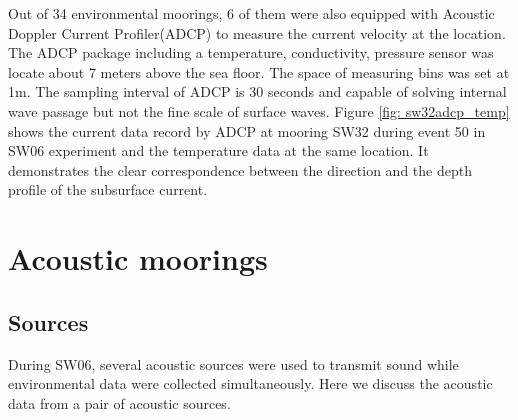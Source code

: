 Out of 34 environmental moorings, 6 of them were also equipped with Acoustic Doppler Current Profiler(ADCP) to measure the current velocity at the location. The ADCP package including a temperature, conductivity, pressure sensor was locate about 7 meters above the sea floor. The space of measuring bins was set at 1m. The sampling interval of ADCP is 30 seconds and capable of solving internal wave passage but not the fine scale of surface waves. Figure \ref{fig: sw32adcp_temp} shows the current data record by ADCP at mooring SW32 during event 50 in SW06 experiment and the temperature data at the same location. It demonstrates the clear correspondence between the direction and the depth profile of the subsurface current. 
\section{Acoustic moorings}
\subsection{Sources}
During SW06, several acoustic sources were used to transmit sound while environmental data were collected
simultaneously\cite{WHOI}. Here we discuss the acoustic data from a pair of acoustic sources.

